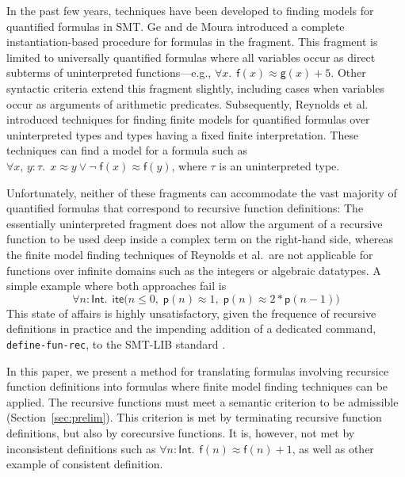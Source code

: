 \documentclass[runningheads,a4paper]{llncs}
\newcommand{\con}[1]{\mathsf{#1}}
\let\oldneg=\neg
\def\neg{\oldneg\;}
\let\oldvee=\vee
\def\vee{\mathrel{\oldvee}}
\newcommand{\teq}{\approx}
\newcommand{\typeint}{\ty{Int}}
\newcommand\ty[1]{\con{#1}}
\newcommand{\lite}{\con{ite}}
\newcommand{\vthinspace}{\kern+0.083333em}
\newcommand{\typ}[1]{^{\vthinspace #1}}
\begin{document}
In the past few years, techniques have been developed to finding models for
quantified formulas in SMT.
Ge and de Moura \cite{GeDeM-CAV-09} introduced a complete instantiation-based
procedure for formulas in the  fragment.
This fragment is limited to universally quantified formulas where all
variables occur as direct subterms of uninterpreted
functions---e.g., $\forall x%
.\;\, \con{f}( x )
\teq \con{g}( x ) + 5$.
Other syntactic criteria extend
this fragment slightly, including cases when variables occur as arguments of
arithmetic predicates. Subsequently, Reynolds et al.\
\cite{ReyEtAl-1-RR-13,reynolds-et-al-2013} introduced techniques for finding finite
models for quantified
formulas over uninterpreted types and types having a fixed finite
interpretation. %
These techniques can
find a model for a formula such as $\forall x,\, y : \tau.\;\, x \teq
y \vee \allowbreak \neg \con{f}( x ) \teq \con{f}( y )$, where $\tau$ is an uninterpreted type.

Unfortunately, neither of these fragments can accommodate the vast majority of
quantified formulas that correspond to recursive function definitions: The
essentially uninterpreted fragment does not allow the argument of a
recursive function to be used deep inside a complex term on the right-hand side,
whereas the finite model finding techniques of Reynolds et al.\ are not
applicable for functions over infinite domains such as the integers or
algebraic datatypes. A simple example where both approaches fail is
\begin{equation}\label{eq:pii}
\forall n : {\typeint}.\;\, \lite\bigl(
n \leq 0,\allowbreak\; \con{p}( n ) \teq 1,\allowbreak\; \con{p}( n ) \teq 2 * \con{p}( n - 1 ) \bigr)
\end{equation}
This state of affairs is highly unsatisfactory, given the frequence of
recursive definitions in practice and the impending addition of a dedicated
command, \texttt{define-fun-rec}, to the SMT-LIB standard \cite{smtlib25}.

In this paper, we present a method for translating formulas involving recursice function
definitions into formulas where finite model finding techniques can be applied.
The recursive functions must meet a semantic criterion to be admissible
(Section~\ref{sec:prelim}). This criterion is met by terminating recursive
function definitions, but also by
 corecursive functions. It is, however, not met by inconsistent
definitions such as $\forall n : {\typeint}.\;\, \con{f}(n) \teq \con{f}(n) +
1$, %
as well as other example of consistent definition.
\end{document}
